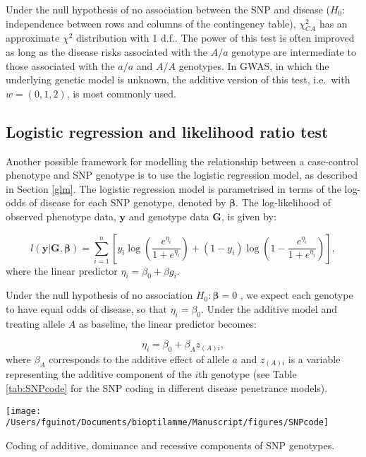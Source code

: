 \documentclass[]{book}
\begin{document}
Under the null hypothesis of no association between the SNP and disease
(\(H_0:\) independence between rows and columns of the contingency table),
\(\chi^2_{CA}\) has an approximate \(\chi^2\) distribution with 1 d.f.. The
power of this test is often improved as long as the disease risks
associated with the \(A/a\) genotype are intermediate to those associated
with the \(a/a\) and \(A/A\) genotypes. In GWAS, in which the underlying
genetic model is unknown, the additive version of this test, i.e.~with
\(w = (0,1,2)\), is most commonly used.

\hypertarget{logitGWAS}{%
\subsection{Logistic regression and likelihood ratio test}\label{logitGWAS}}

Another possible framework for modelling the relationship between a
case-control phenotype and SNP genotype is to use the logistic
regression model, as described in Section \ref{glm}. The logistic
regression model is parametrised in terms of the log-odds of disease for
each SNP genotype, denoted by \(\boldsymbol{\beta}\). The log-likelihood of observed
phenotype data, \(\mathbf{y}\) and genotype data \(\mathbf{G}\), is given by:

\[l(\mathbf{y} | \mathbf{G},\boldsymbol{\beta}) = \sum_{i=1}^n \left[ y_i \log \left( \frac{e^{\eta_i}}{1+e^{\eta_i}}\right) +  (1-y_i)\log \left( 1 - \frac{e^{\eta_i}}{1+e^{\eta_i}} \right) \right],\]
where the linear predictor \(\eta_i = \beta_0 + \beta g_i\).

Under the null hypothesis of no association \(H_0: \boldsymbol{\beta} = 0\) , we
expect each genotype to have equal odds of disease, so that
\(\eta_i = \beta_0\). Under the additive model and treating allele \(A\) as
baseline, the linear predictor becomes:

\[\eta_i = \beta_0 + \beta_A z_{(A)i},\] where \(\beta_A\) corresponds to
the additive effect of allele \(a\) and \(z_{(A)i}\) is a variable
representing the additive component of the \(i\)th genotype (see Table
\ref{tab:SNPcode} for the SNP coding in different disease penetrance
models).

\begin{center}\texttt{[image: /Users/fguinot/Documents/bioptilamme/Manuscript/figures/SNPcode]} \end{center}

\label{tab:SNPcode}Coding of additive, dominance and recessive components of SNP genotypes.
\end{document}

